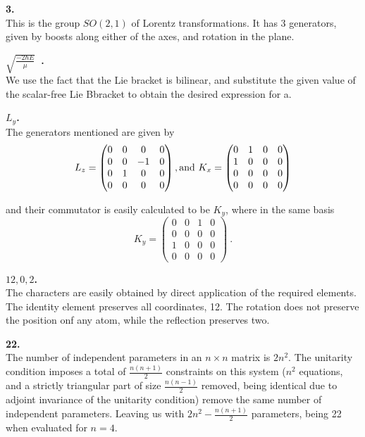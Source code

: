 \begin{alphaparts}

    \questionpart \textbf{3.}\\
    This is the group $SO(2, 1)$ of Lorentz transformations. It has 3
    generators, given by boosts along either of the axes, and rotation in the
    plane.

    \questionpart \textbf{$\sqrt{\frac{-2\hbar E}{\mu}}$~.}\\
    We use the fact that the Lie bracket is bilinear, and substitute the given
    value of the scalar-free Lie Bbracket to obtain the desired expression for a.

    \questionpart \textbf{$L_y$.}\\
    The generators mentioned are given by
    \[L_z = \begin{pmatrix}
        0 & 0 & 0 & 0 \\
        0 & 0 &-1 & 0 \\
        0 & 1 & 0 & 0 \\
        0 & 0 & 0 & 0
    \end{pmatrix}, \textnormal{and }
    K_x = \begin{pmatrix}
        0 & 1 & 0 & 0 \\
        1 & 0 & 0 & 0 \\
        0 & 0 & 0 & 0 \\
        0 & 0 & 0 & 0
    \end{pmatrix} \]

    and their commutator is easily calculated to be $K_y$, where in the same
    basis
    \[K_y = \begin{pmatrix}
        0 & 0 & 1 & 0 \\
        0 & 0 & 0 & 0 \\
        1 & 0 & 0 & 0 \\
        0 & 0 & 0 & 0
    \end{pmatrix}~.\]

    \questionpart \textbf{${12, 0, 2}$.}\\
    The characters are easily obtained by direct application of the required
    elements. The identity element preserves all coordinates, 12. The rotation
    does not preserve the position onf any atom, while the reflection preserves
    two.

    \questionpart \textbf{22.}\\
    The number of independent parameters in an $n \times n$ matrix is $2n^2$.
    The unitarity condition imposes a total of $\frac{n(n+1)}{2}$ constraints on
    this system ($n^2$ equations, and a strictly triangular part of size
    $\frac{n(n-1)}{2}$ removed, being identical due to adjoint invariance of the
    unitarity condition) remove the same number of independent parameters.
    Leaving us with $2n^2 - \frac{n(n+1)}{2}$ parameters, being 22 when
    evaluated for $n = 4$.

\end{alphaparts}